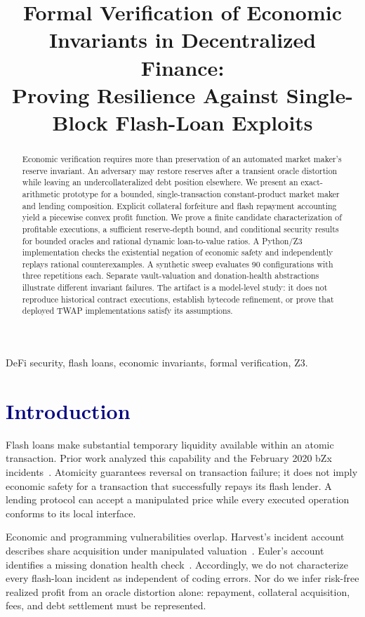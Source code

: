 \documentclass[conference]{IEEEtran}
\title{\color{Navy}Formal Verification of Economic Invariants in Decentralized Finance:\\Proving Resilience Against Single-Block Flash-Loan Exploits}
\author{\IEEEauthorblockN{Student research project}\IEEEauthorblockA{Formal methods and blockchain cybersecurity\\\textcolor{Teal}{Visual edition -- September 2026}}}
\begin{document}
\maketitle
\begin{abstract}
Economic verification requires more than preservation of an automated market
maker's reserve invariant. An adversary may restore reserves after a transient
oracle distortion while leaving an undercollateralized debt position elsewhere.
We present an exact-arithmetic prototype for a bounded, single-transaction
constant-product market maker and lending composition. Explicit collateral
forfeiture and flash repayment accounting yield a piecewise convex profit
function. We prove a finite candidate characterization of profitable executions,
a sufficient reserve-depth bound, and conditional security results for bounded
oracles and rational dynamic loan-to-value ratios. A Python/Z3 implementation
checks the existential negation of economic safety and independently replays
rational counterexamples. A synthetic sweep evaluates 90 configurations with
three repetitions each. Separate vault-valuation and donation-health abstractions
illustrate different invariant failures. The artifact is a model-level study:
it does not reproduce historical contract executions, establish bytecode
refinement, or prove that deployed TWAP implementations satisfy its assumptions.
\end{abstract}
\begin{IEEEkeywords}
DeFi security, flash loans, economic invariants, formal verification, Z3.
\end{IEEEkeywords}

\section{\textcolor{Navy}{Introduction}}
Flash loans make substantial temporary liquidity available within an atomic
transaction. Prior work analyzed this capability and the February 2020 bZx
incidents~\cite{qin}. Atomicity guarantees reversal on transaction failure;
it does not imply economic safety for a transaction that successfully repays
its flash lender. A lending protocol can accept a manipulated price while
every executed operation conforms to its local interface.

Economic and programming vulnerabilities overlap. Harvest's incident account
describes share acquisition under manipulated valuation~\cite{harvest}.
Euler's account identifies a missing donation health check~\cite{euler}.
Accordingly, we do not characterize every flash-loan incident as independent
of coding errors. Nor do we infer risk-free realized profit from an oracle
distortion alone: repayment, collateral acquisition, fees, and debt settlement
must be represented.
\end{document}
